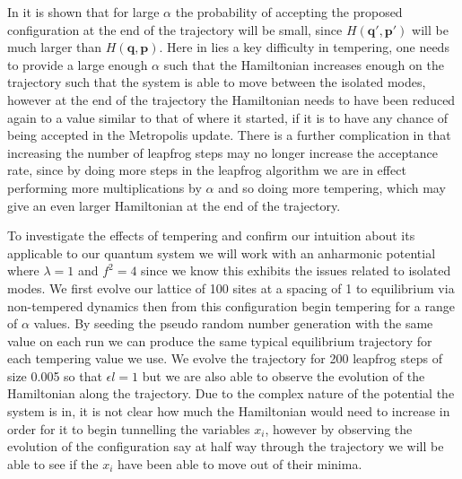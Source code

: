 \documentclass[12pt]{article}
\begin{document}
    In \cite{neal_2011} it is shown that for large $\alpha$ the probability of accepting the proposed configuration at the end of the trajectory will be small, since $H\left(\bm{q}',\bm{p}'\right)$ will be much larger than $H\left(\bm{q},\bm{p}\right)$. Here in lies a key difficulty in tempering, one needs to provide a large enough $\alpha$ such that the Hamiltonian increases enough on the trajectory such that the system is able to move between the isolated modes, however at the end of the trajectory the Hamiltonian needs to have been reduced again to a value similar to that of where it started, if it is to have any chance of being accepted in the Metropolis update. There is a further complication in that increasing the number of leapfrog steps may no longer increase the acceptance rate, since by doing more steps in the leapfrog algorithm we are in effect performing more multiplications by $\alpha$ and so doing more tempering, which may give an even larger Hamiltonian at the end of the trajectory.

    To investigate the effects of tempering and confirm our intuition about its applicable to our quantum system we will work with an anharmonic potential where $\lambda=1$ and $f^2=4$ since we know this exhibits the issues related to isolated modes. We first evolve our lattice of 100 sites at a spacing of 1 to equilibrium via non-tempered dynamics then from this configuration begin tempering for a range of $\alpha$ values. By seeding the pseudo random number generation with the same value on each run we can produce the same typical equilibrium trajectory for each tempering value we use. We evolve the trajectory for 200 leapfrog steps of size 0.005 so that $\epsilon l = 1$ but we are also able to observe the evolution of the Hamiltonian along the trajectory. Due to the complex nature of the potential the system is in, it is not clear how much the Hamiltonian would need to increase in order for it to begin tunnelling the variables $x_i$, however by observing the evolution of the configuration say at half way through the trajectory we will be able to see if the $x_i$ have been able to move out of their minima.
\end{document}
